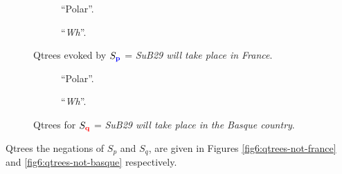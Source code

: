 \begin{figure}[H]
	\centering
	\begin{subfigure}[b]{.45\linewidth}
		\centering
		\caption[]{``Polar''.}\label{fig6:qtree-france-polar}
	\end{subfigure}\hfill
	\begin{subfigure}[b]{.45\linewidth}
		\centering
		\caption[]{``\textit{Wh}''.}\label{fig6:qtree-france-wh}
	\end{subfigure}
	\caption[]{Qtrees evoked by $S_{\textbf{\textcolor{blue}{p}}}$ = \textit{SuB29 will take place in France}.}\label{fig6:qtrees-france}
\end{figure}

\begin{figure}[H]
	\centering
	\begin{subfigure}[b]{.25\linewidth}
		\centering
		\caption[]{``Polar''.}\label{fig6:qtree-basque-polar}
	\end{subfigure}\hfill
	\begin{subfigure}[b]{.65\linewidth}
		\centering
		\caption[]{``\textit{Wh}''.}\label{fig6:qtree-basque-wh}
	\end{subfigure}
	\caption[]{Qtrees for $S_{\textbf{\textcolor{red}{q}}}$ = \textit{SuB29 will take place in the Basque country}.}\label{fig6:qtrees-basque}
\end{figure}
 
Qtrees the negations of $S_p$ and $S_q$, are given in Figures \ref{fig6:qtrees-not-france} and \ref{fig6:qtrees-not-basque} respectively. 



